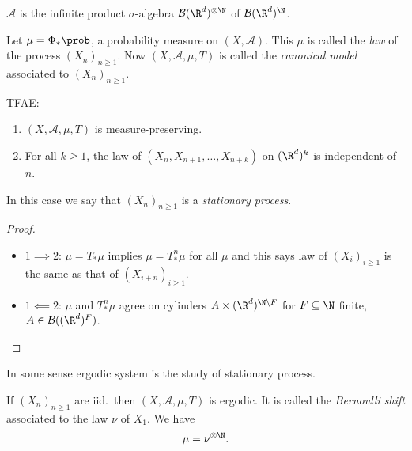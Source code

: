 \documentclass[a4paper]{article}
\renewcommand{\P}{\prob} %
\begin{document}
\begin{note}
  \(\mathcal A\) is the infinite product \(\sigma\)-algebra \(\mathcal B(\R^d)^{\otimes \N}\) of \(\mathcal B(\R^d)^\N\).
\end{note}

Let \(\mu = \Phi_*\P\), a probability measure on \((X, \mathcal A)\). This \(\mu\) is called the \emph{law} of the process \((X_n)_{n \geq 1}\). Now \((X, \mathcal A, \mu, T)\) is called the \emph{canonical model} associated to \((X_n)_{n \geq 1}\).

\begin{proposition}
  TFAE:
  \begin{enumerate}
  \item \((X, \mathcal A, \mu, T)\) is measure-preserving.
  \item For all \(k \geq 1\), the law of \((X_n, X_{n + 1}, \dots, X_{n + k})\) on \((\R^d)^k\) is independent of \(n\).
  \end{enumerate}
  In this case we say that \((X_n)_{n \geq 1}\) is a \emph{stationary process}.
\end{proposition}

\begin{proof}\leavevmode
  \begin{itemize}
  \item \(1 \implies 2\): \(\mu = T_*\mu\) implies \(\mu = T^n_*\mu\) for all \(\mu\) and this says law of \((X_i)_{i \geq 1}\) is the same as that of \((X_{i + n})_{i \geq 1}\).
  \item \(1 \impliedby 2\): \(\mu\) and \(T_*^n\mu\) agree on cylinders \(A \times (\R^d)^{\N \setminus F}\) for \(F \subseteq \N\) finite, \(A \in \mathcal B((\R^d)^F)\).
  \end{itemize}
\end{proof}

In some sense ergodic system is the study of stationary process.

\begin{proposition}
  If \((X_n)_{n \geq 1}\) are iid.\ then \((X, \mathcal A, \mu, T)\) is ergodic. It is called the \emph{Bernoulli shift} associated to the law \(\nu\) of \(X_1\). We have
  \[
    \mu = \nu^{\otimes \N}.
  \]
\end{proposition}
\end{document}
